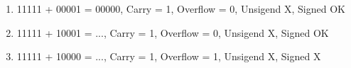 \begin{enumerate}
	\item 11111 + 00001 = 00000, Carry = 1, Overflow = 0, Unsigend X, Signed OK
	\item 11111 + 10001  = ..., Carry = 1, Overflow = 0, Unsigend X, Signed OK
	\item 11111 + 10000  = ..., Carry = 1, Overflow = 1, Unsigend X, Signed X
\end{enumerate}
